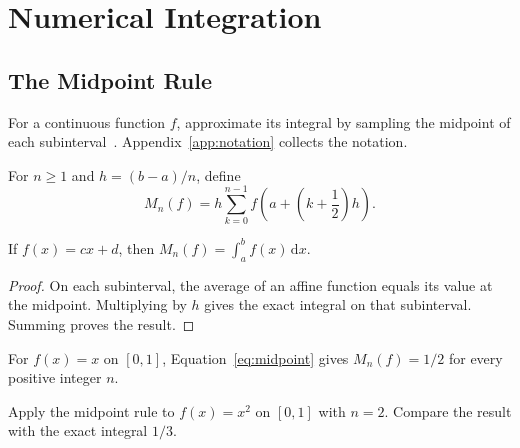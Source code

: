 \chapter{Numerical Integration}
\label{ch:integration}

\section{The Midpoint Rule}
For a continuous function \(f\), approximate its integral by sampling
the midpoint of each subinterval~\cite{calculus}.
Appendix~\ref{app:notation} collects the notation.

\begin{definition}
For \(n\geq 1\) and \(h=(b-a)/n\), define
\begin{equation}
  M_n(f) = h\sum_{k=0}^{n-1}
    f\left(a+\left(k+\frac{1}{2}\right)h\right).
  \label{eq:midpoint}
\end{equation}
\end{definition}

\begin{theorem}
\label{thm:affine}
If \(f(x)=cx+d\), then \(M_n(f)=\int_a^b f(x)\,\mathrm{d}x\).
\end{theorem}
\begin{proof}
On each subinterval, the average of an affine function equals its
value at the midpoint. Multiplying by \(h\) gives the exact integral
on that subinterval. Summing proves the result.
\end{proof}

\begin{example}
For \(f(x)=x\) on \([0,1]\), Equation~\eqref{eq:midpoint} gives
\(M_n(f)=1/2\) for every positive integer \(n\).
\end{example}

\begin{exercise}
Apply the midpoint rule to \(f(x)=x^2\) on \([0,1]\) with \(n=2\).
Compare the result with the exact integral \(1/3\).
\end{exercise}

